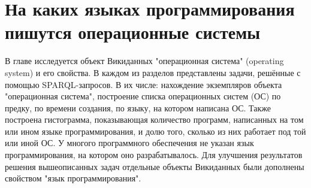 \chapter{На каких языках программирования пишутся операционные системы}
\label{ch:operating-sysmets}

В главе исследуется объект Викиданных "операционная система" (operating system) и его свойства. В каждом из разделов представлены задачи, решённые с помощью SPARQL-запросов. В их числе: нахождение экземпляров объекта "операционная система", построение списка операционных систем (ОС) по предку, по времени создания, по языку, на котором написана ОС. Также построена гистограмма, показывающая количество программ, написанных на том или ином языке программирования, и долю того, сколько из них работает под той или иной ОС. У многого программного обеспечения не указан язык программирования, на котором оно разрабатывалось. Для улучшения результатов решения вышеописанных задач отдельные объекты Викиданных были дополнены свойством "язык программирования".
